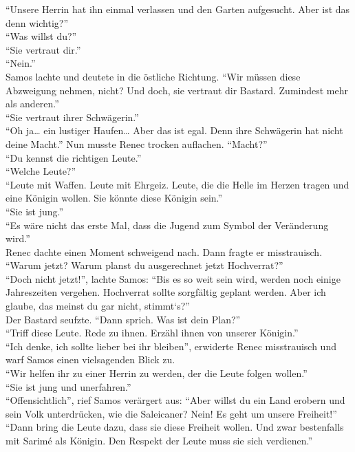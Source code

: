 ``Unsere Herrin hat ihn einmal verlassen und den Garten aufgesucht. Aber ist das denn wichtig?''\\
``Was willst du?''\\
``Sie vertraut dir.''\\
``Nein.''\\
Samos lachte und deutete in die östliche Richtung. ``Wir müssen diese Abzweigung nehmen, nicht? Und 
doch, sie vertraut dir Bastard. Zumindest mehr als anderen.''\\
``Sie vertraut ihrer Schwägerin.''\\
``Oh ja… ein lustiger Haufen… Aber das ist egal. Denn ihre Schwägerin hat nicht deine Macht.''
Nun musste Renec trocken auflachen. ``Macht?''\\
``Du kennst die richtigen Leute.''\\
``Welche Leute?''\\
``Leute mit Waffen. Leute mit Ehrgeiz. Leute, die die Helle im Herzen tragen und eine Königin 
wollen. Sie könnte diese Königin sein.''\\
``Sie ist jung.''\\
``Es wäre nicht das erste Mal, dass die Jugend zum Symbol der Veränderung wird.''\\
Renec dachte einen Moment schweigend nach. Dann fragte er misstrauisch. ``Warum jetzt? Warum planst 
du ausgerechnet jetzt Hochverrat?''\\
``Doch nicht jetzt!'', lachte Samos: ``Bis es so weit sein wird, werden noch einige Jahreszeiten 
vergehen. Hochverrat sollte sorgfältig geplant werden. Aber ich glaube, das meinst du gar nicht, 
stimmt‘s?''\\
Der Bastard seufzte. ``Dann sprich. Was ist dein Plan?''\\
``Triff diese Leute. Rede zu ihnen. Erzähl ihnen von unserer Königin.''\\
``Ich denke, ich sollte lieber bei ihr bleiben'', erwiderte Renec misstrauisch und warf Samos einen 
vielsagenden Blick zu.\\
``Wir helfen ihr zu einer Herrin zu werden, der die Leute folgen wollen.''\\
``Sie ist jung und unerfahren.''\\
``Offensichtlich'', rief Samos verärgert aus: ``Aber willst du ein Land erobern und sein Volk 
unterdrücken, wie die Saleicaner? Nein! Es geht um unsere Freiheit!''\\
``Dann bring die Leute dazu, dass sie diese Freiheit wollen. Und zwar bestenfalls mit Sarimé als 
Königin. Den Respekt der Leute muss sie sich verdienen.''\\

